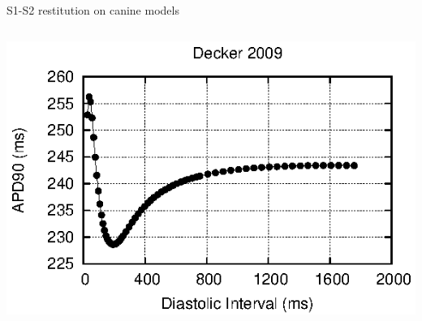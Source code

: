 \documentclass[t,xcolor={usenames,dvipsnames}]{beamer}
\begin{document}
\begin{frame}{S1-S2 restitution on canine models}
\begin{columns}[T]
\begin{column}{.33\linewidth}
\begin{center}
\vspace{.1cm}
\includegraphics[width=\textwidth]{decker_2009_s1s2_curve}
\end{center}
\end{column}
\end{columns}
\end{frame}
\end{document}
